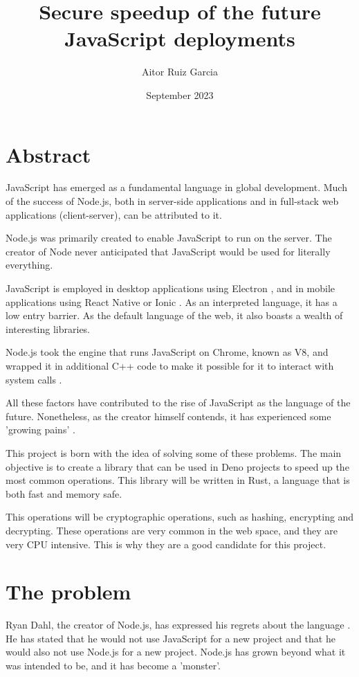\documentclass[12pt, letterpaper]{article}
\title{Secure speedup of the future JavaScript deployments}
\author{Aitor Ruiz Garcia}
\date{September 2023}
\begin{document}
\maketitle
\begin{multicols}{2}
    \section{Abstract}
    JavaScript has emerged as a fundamental language in global development. Much of the success of Node.js, both in server-side applications and in full-stack web applications (client-server), can be attributed to it.

    Node.js was primarily created to enable JavaScript to run on the server. The creator of Node never anticipated that JavaScript would be used for literally everything.

    JavaScript is employed in desktop applications using Electron \cite{ELECTRON}, and in mobile applications using React Native \cite{RN} or Ionic \cite{IONIC}. As an interpreted language, it has a low entry barrier. As the default language of the web, it also boasts a wealth of interesting libraries.

    Node.js took the engine that runs JavaScript on Chrome, known as V8, and wrapped it in additional C++ code to make it possible for it to interact with system calls \cite{FKNODE}.

    All these factors have contributed to the rise of JavaScript as the language of the future. Nonetheless, as the creator himself contends, it has experienced some 'growing pains' \cite{FKNODE}.

    This project is born with the idea of solving some of these problems. The main objective is to create a library that can be used in Deno projects to speed up the most common operations. This library will be written in Rust, a language that is both fast and memory safe.

    This operations will be cryptographic operations, such as hashing, encrypting and decrypting. These operations are very common in the web space, and they are very CPU intensive. This is why they are a good candidate for this project.

    \section{The problem}

    Ryan Dahl, the creator of Node.js, has expressed his regrets about the language \cite{FKNODE}. He has stated that he would not use JavaScript for a new project and that he would also not use Node.js for a new project. Node.js has grown beyond what it was intended to be, and it has become a 'monster'.


\end{multicols}
\end{document}
